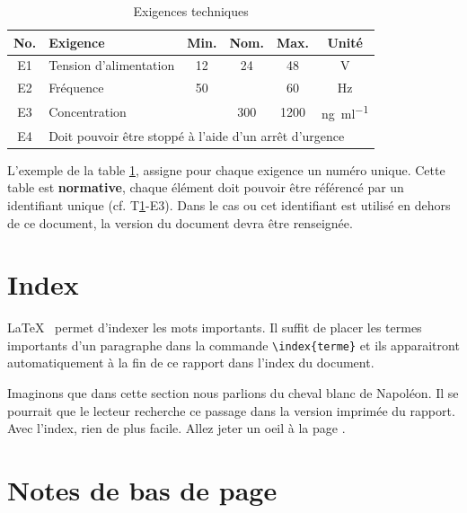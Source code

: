 \documentclass[
    iai, %
    eai, %
]{heig-tb}
\begin{document}
\begin{table}[h]
  \begin{center}
    \caption{Exigences techniques \label{specification}}
    \begin{tabularx}{\textwidth}{cXcccc}
      No. & Exigence                                                                   & Min. & Nom. & Max. & Unité                           \\ \toprule
      E1  & Tension d'alimentation                                                     & 12   & 24   & 48   & \si{\volt}                      \\ \midrule
      E2  & Fréquence                                                                  & 50   &      & 60   & \si{\hertz}                     \\ \midrule
      E3  & Concentration                                                              &      & 300  & 1200 & \si{\nano\gram\per\milli\litre} \\ \midrule
      E4  & \multicolumn{5}{l}{Doit pouvoir être stoppé à l'aide d'un arrêt d'urgence}
    \end{tabularx}
  \end{center}
\end{table}

L'exemple de la table \ref{specification}, assigne pour chaque exigence un numéro unique. Cette table est \textbf{normative}, chaque élément doit pouvoir être référencé par un identifiant unique (cf. T\ref{specification}-E3). Dans le cas ou cet identifiant est utilisé en dehors de ce document, la version du document devra être renseignée.

\section{Index}
\LaTeX~ permet d'indexer les mots  importants. Il suffit de placer les termes importants d'un paragraphe dans la commande \texttt{\textbackslash index\{terme\}} et ils apparaitront automatiquement à la fin de ce rapport dans l'index du document.


Imaginons que dans cette section nous parlions du cheval blanc  de Napoléon. Il se pourrait que le lecteur recherche ce passage dans la version imprimée du rapport. Avec l'index, rien de plus facile. Allez jeter un oeil à la page \pageref{index}.

\section{Notes de bas de page}
\end{document}
